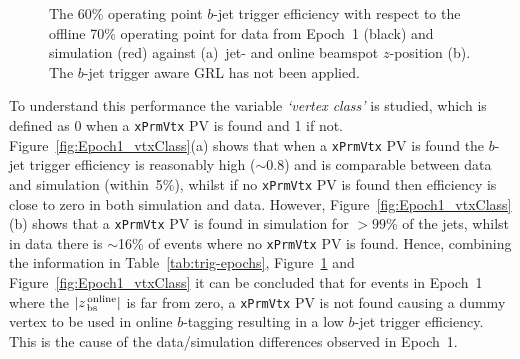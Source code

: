 \begin{figure}[!htb]
  \begin{center}
    \captionsetup[subfigure]{aboveskip=0pt,justification=centering}
  \end{center}
  \vspace{-1em}
  \caption[The $b$-jet trigger efficiency 
    for data from Epoch~1 and simulation against jet-\pT{} and online beamspot $z$-position.
    The $b$-jet trigger aware GRL has not been applied.]
          {The 60\% operating point $b$-jet trigger efficiency with respect to the offline 70\% operating point
            for data from Epoch~1 (black) and simulation (red) against (a)~jet-\pT{} and online beamspot $z$-position (b).
            The $b$-jet trigger aware GRL has not been applied.}
          \label{fig:Epoch1_eff}
            \vspace{-0.5em}

\end{figure}

To understand this performance the variable \textit{`vertex class'} is studied, which is defined as 0 when a \verb|xPrmVtx| PV is found and 1 if not.
Figure~\ref{fig:Epoch1_vtxClass}(a) shows that when a \verb|xPrmVtx| PV is found the $b$-jet trigger efficiency is reasonably high ($\sim$0.8)
and is comparable between data and simulation (within~5\%),
whilst if no \verb|xPrmVtx| PV is found then efficiency is close to zero in both simulation and data.
However, Figure~\ref{fig:Epoch1_vtxClass}(b) shows that a \verb|xPrmVtx| PV is found in simulation for $>99$\% of the jets,
whilst in data there is $\sim$16\% of events where no \verb|xPrmVtx| PV is found.
Hence, combining the information in Table~\ref{tab:trig-epochs}, Figure~\ref{fig:Epoch1_eff} and Figure~\ref{fig:Epoch1_vtxClass}
it can be concluded that for events in  Epoch~1 where the  $|z_{\,\text{bs}}^{\text{\,online}}|$ is far from zero,
a \verb|xPrmVtx| PV is not found causing a dummy vertex to be used in online $b$-tagging resulting in a low $b$-jet trigger efficiency.
This is the cause of the data/simulation differences observed in Epoch~1. 

